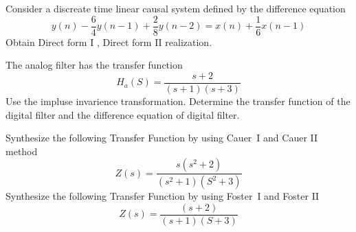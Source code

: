 \documentclass[12pt,a4paper]{exam}
\begin{document}
\bracketedpoints
\pointsinrightmargin

\begin{questions}
\Large
\question[5] Consider a discreate time linear causal system defined by the difference equation
\[y(n)-\frac{6}{4}y(n-1)+\frac{2}{8}y(n-2)=x(n)+\frac{1}{6}x(n-1)\]
Obtain Direct form I , Direct form II realization.

\question[5] The analog filter has the transfer function
\[    H_{a}(S)=\frac{s+2}{(s+1)(s+3)}         \]
Use the impluse invarience  transformation.
Determine the transfer function of the digital filter and the difference equation of digital filter.

\question[7] Synthesize the following Transfer Function by using Cauer~I and Cauer II method
\[               Z(s)=\frac{s(s^2+2)}{(s^2+1)(S^2+3)} \]
\question[8] Synthesize the following Transfer Function by using Foster~I and Foster II
\[               Z(s)=\frac{(s+2)}{(s+1)(S+3)} \]




\end{questions}
\end{document}
